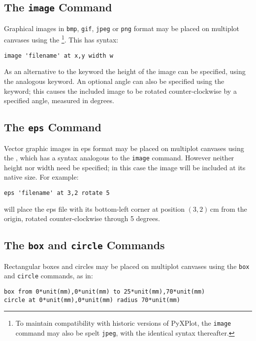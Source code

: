 \subsection{The {\tt image} Command}

Graphical images in {\tt bmp}, {\tt gif}, {\tt jpeg} or {\tt png} format may be
placed on multiplot canvases using the \footnote{To maintain
compatibility with historic versions of PyXPlot, the {\tt image} command may
also be spelt {\tt jpeg}, with the identical syntax thereafter.}. This has
syntax:
\begin{verbatim}
image 'filename' at x,y width w
\end{verbatim}

As an alternative to the  keyword the height of the image can be
specified, using the analogous  keyword.  An optional angle can
also be specified using the  keyword; this causes the included
image to be rotated counter-clockwise by a specified angle, measured in
degrees.

\subsection{The {\tt eps} Command}

Vector graphic images in eps format may be placed on multiplot canvases
using the , which has a syntax analogous to the {\tt image}
command.  However neither height nor width need be specified; in this case the
image will be included at its native size.  For example:

\begin{verbatim}
eps 'filename' at 3,2 rotate 5
\end{verbatim}

\noindent will place the eps file with its bottom-left corner at position
$(3,2)$\,cm from the origin, rotated counter-clockwise through 5 degrees.

\subsection{The {\tt box} and {\tt circle} Commands}

Rectangular boxes and circles may be placed on multiplot canvases
using the {\tt box} and {\tt circle} commands, as
in:

\begin{verbatim}
box from 0*unit(mm),0*unit(mm) to 25*unit(mm),70*unit(mm)
circle at 0*unit(mm),0*unit(mm) radius 70*unit(mm)
\end{verbatim}

